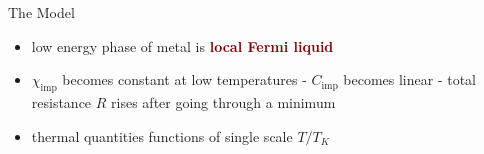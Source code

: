 \documentclass[aspectratio=169]{beamer}
\newcommand{\focus}[1]{\textcolor{maroon}{\textbf{#1}}}
\begin{document}
\begin{frame}[noframenumbering]{The Model}
{\begin{minipage}{0.68\textwidth}
\begin{itemize}[<+-|alert@+>]
\item low energy phase of metal is \focus{local Fermi liquid}\\[10pt]
\item \(\chi_\text{imp}\) becomes constant at low temperatures - \(C_\text{imp}\) becomes linear - total resistance \(R\) rises after going through a minimum\\[10pt]
\item thermal quantities functions of single scale \(T/T_K\)\\[10pt]
\end{itemize}
\end{minipage}
\begin{minipage}{0.3\textwidth}

\end{minipage}}
\end{frame}
\end{document}
